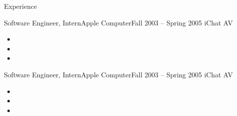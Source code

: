 \documentclass[]{Sohaib-Mohamed}
\begin{document}
\makeheader

\begin{cvsection}{Experience}
   \begin{cvsubsection}{Software Engineer, Intern}{Apple Computer}{Fall 2003 -- Spring 2005}
      iChat AV
      \begin{itemize}
         \item
         \item
         \item
      \end{itemize}
   \end{cvsubsection}
   \begin{cvsubsection}{Software Engineer, Intern}{Apple Computer}{Fall 2003 -- Spring 2005}
      iChat AV
      \begin{itemize}
         \item
         \item
         \item
      \end{itemize}
   \end{cvsubsection}
\end{cvsection}
\end{document}

